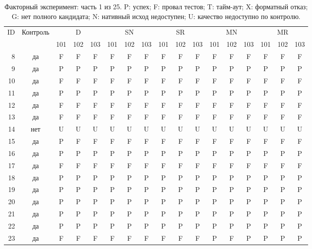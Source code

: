 \begin{table}[p]\centering\footnotesize
\setlength{\tabcolsep}{3pt}
\caption{Факторный эксперимент: часть 1 из 25. P: успех; F: провал тестов; T: тайм-аут; X: форматный отказ; G: нет полного кандидата; N: нативный исход недоступен; U: качество недоступно по контролю.}
\begin{tabular*}{\textwidth}{@{\extracolsep{\fill}}rcccccccccccccccc}\toprule
ID & Контроль & \multicolumn{3}{c}{D} & \multicolumn{3}{c}{SN} & \multicolumn{3}{c}{SR} & \multicolumn{3}{c}{MN} & \multicolumn{3}{c}{MR}\\
\cmidrule(lr){3-5}\cmidrule(lr){6-8}\cmidrule(lr){9-11}\cmidrule(lr){12-14}\cmidrule(lr){15-17}
 & & 101 & 102 & 103 & 101 & 102 & 103 & 101 & 102 & 103 & 101 & 102 & 103 & 101 & 102 & 103\\\midrule
8 & да & F & F & F & F & F & F & F & F & F & F & F & F & F & F & F\\
9 & да & P & P & P & P & P & P & P & P & P & P & P & P & P & P & P\\
10 & да & F & F & F & F & F & F & F & F & F & F & F & F & F & F & F\\
11 & да & P & P & P & P & P & P & P & P & P & P & P & P & P & P & P\\
12 & да & F & F & F & F & F & F & F & F & F & F & F & F & F & F & F\\
13 & да & F & F & F & F & F & F & F & F & F & F & F & F & F & F & F\\
14 & нет & U & U & U & U & U & U & U & U & U & U & U & U & U & U & U\\
15 & да & P & F & F & F & F & F & F & F & F & F & F & F & F & F & F\\
16 & да & P & P & P & P & P & P & P & P & P & P & P & P & P & P & P\\
17 & да & F & F & F & F & F & F & F & F & F & F & F & F & F & F & F\\
18 & да & P & P & P & P & P & P & P & P & P & P & P & P & P & P & P\\
19 & да & P & P & P & P & P & P & P & P & P & P & P & P & P & P & P\\
20 & да & P & P & P & P & P & P & P & P & P & P & P & P & P & P & P\\
21 & да & P & P & P & P & P & P & P & P & P & P & P & P & P & P & P\\
22 & да & P & P & P & P & P & P & P & P & P & P & P & P & P & P & P\\
23 & да & F & F & F & F & F & F & F & F & F & P & F & P & P & P & P\\

\end{tabular*}
\end{table}
